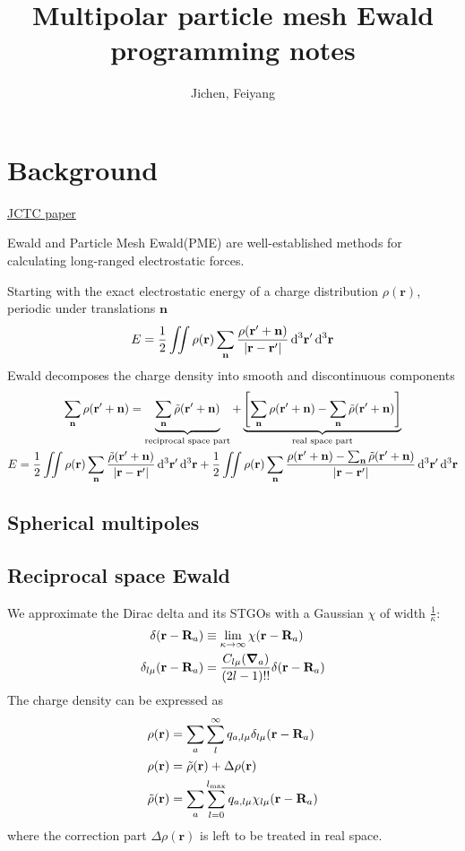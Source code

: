 \documentclass[12pt]{extarticle}
\title{Multipolar particle mesh Ewald programming notes}
\author{Jichen, Feiyang}
\renewcommand{\bf}{\mathbf}
\begin{document}
    \maketitle
    \section{Background}
    \href{https://pubs.acs.org/doi/pdf/10.1021/ct5007983}{JCTC paper}

    Ewald and Particle Mesh Ewald(PME) are well-established methods for calculating long-ranged electrostatic forces.
    
    Starting with the exact electrostatic energy of a charge distribution \(\rho(\bf r)\), periodic under translations \(\bf n\)
    \[
        E = \frac{1}{2} \iint \rho(\bf r) \sum_{\bf n} \frac{\rho \pqty{ \bf r' + \bf n}}{\abs{\bf r - \bf r'}} \dd[3]{\bf r'} \dd[3]{\bf r}
    \]
    Ewald decomposes the charge density into smooth and discontinuous components
    \begin{gather*}
        \sum_{\bf n} \rho \pqty{ \bf r' + \bf n} = \underbrace{\sum_{\bf n} \tilde{\rho} \pqty{ \bf r' + \bf n}}_\text{reciprocal space part} + \underbrace{\bqty{\sum_{\bf n} \rho \pqty{ \bf r' + \bf n} - \sum_{\bf n} \tilde{\rho} \pqty{ \bf r' + \bf n}}}_ \text{real space part}\\
        E = \frac{1}{2} \iint \rho(\bf r) \sum_{\bf n} \frac{\tilde{\rho} \pqty{ \bf r' + \bf n}}{\abs{\bf r - \bf r'}} \dd[3]{\bf r'} \dd[3]{\bf r} + \frac{1}{2} \iint \rho(\bf r) \sum_{\bf n} \frac{ \rho \pqty{ \bf r' + \bf n} - \sum_{\bf n} \tilde{\rho} \pqty{ \bf r' + \bf n}}{\abs{\bf r - \bf r'}} \dd[3]{\bf r'} \dd[3]{\bf r}
    \end{gather*}
    \subsection{Spherical multipoles}
    
    \subsection{Reciprocal space Ewald}
    We approximate the Dirac delta and its STGOs with a Gaussian \(\chi\) of width \(\frac{1}{\kappa}\):
    \begin{align*}
        \delta ( \bf r - \bf R_a) &\equiv \lim_{\kappa \to  \infty} \chi (\bf r - \bf R_a)\\
        \delta_{l \mu } (\bf r - \bf R_a) &= \frac{C_{l \mu} (\grad_a)}{(2l - 1)!!} \delta (\bf r - \bf R_a)
    \end{align*}
    The charge density can be expressed as 
    \begin{align*}
        \rho (\bf r) &= \sum_{a} \sum_l^\infty q_{a, l \mu} \delta_{l \mu} \pqty{\bf r - \bf R_a}\\
        \rho (\bf r) &= \tilde{\rho} ( \bf r) + \Delta \rho(\bf r)\\
        \tilde{\rho} ( \bf r) &=  \sum_{a} \sum_{l = 0}^{l_{\max}} q_{a, l \mu} \chi_{l \mu} \pqty{\bf r - \bf R_a}
    \end{align*}
    where the correction part \(\Delta \rho (\bf r)\) is left to be treated in real space. 
    
\end{document}
